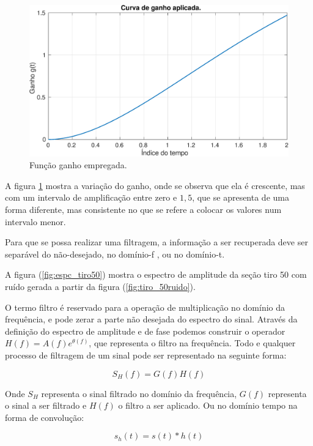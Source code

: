 \begin{figure}[H]
\centering
\includegraphics[totalheight=7.0cm]{figuras/cap3/figura_ganho.eps}
\caption{Função ganho empregada.}
\label{fig:figura_ganho}
\end{figure}

A figura \ref{fig:figura_ganho} mostra a variação do ganho, onde se observa que ela é crescente, mas com um intervalo de amplificação entre zero e $1,5$, que se apresenta de uma forma diferente, mas consistente no que se refere a colocar os valores num intervalo menor.  

Para que se possa realizar uma filtragem, a informação a ser recuperada deve ser separável do não-desejado, no domínio-f , ou no domínio-t.

A figura (\ref{fig:espc_tiro50}) mostra o espectro de amplitude da seção tiro 50 com ruído gerada a partir da figura (\ref{fig:tiro_50ruido}).

O termo filtro é reservado para a operação de multiplicação no domínio da frequência, e pode zerar a parte não desejada do espectro do sinal. Através da definição do espectro de amplitude e de fase podemos construir o operador $H(f)=A(f)e^{\theta(f)}$, que representa o filtro na frequência. Todo e qualquer processo de filtragem de um sinal pode ser representado na seguinte forma:

\begin{equation}
S_{H}(f)=G(f) H(f)
\label{eq:filtragem}
\end{equation}

Onde $S_{H}$ representa o sinal filtrado no domínio da frequência, $G(f)$ representa o sinal a ser filtrado e $H(f)$ o filtro a ser aplicado. Ou no domínio tempo na forma de convolução:

\begin{equation}
s_{h}(t)=s(t) \ast h(t)
\label{eq:filtragem_conv}
\end{equation}

